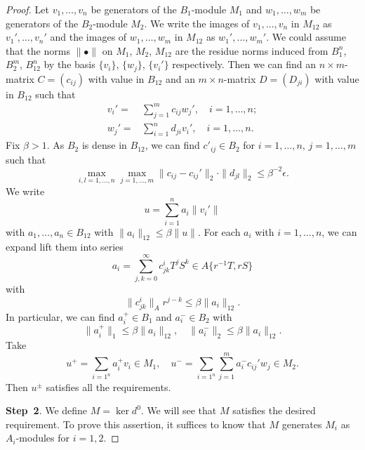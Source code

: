 \begin{proof}
    Let $v_1,\ldots,v_n$ be generators of the $B_1$-module $M_1$ and $w_1,\ldots,w_m$ be generators of the $B_2$-module $M_2$. 
    We write the images of $v_1,\ldots,v_n$ in $M_{12}$ as $v_1',\ldots,v_{n}'$ and the images of $w_1,\ldots,w_m$ in $M_{12}$ as $w_1',\ldots,w_m'$. 
    We could assume that the norms $\|\bullet\|$ on $M_1$, $M_2$, $M_{12}$ are the residue norms induced from $B_1^n$, $B_2^m$, $B_{12}^n$ by the basis $\{v_i\}$, $\{w_j\}$, $\{v_i'\}$ respectively. 
    Then we can find an $n\times m$-matrix $C=(c_{ij})$ with value in $B_{12}$ and an $m\times n$-matrix $D=(D_{ji})$ with value in $B_{12}$ such that
    \[
        \begin{aligned}
            v_i'=&\sum_{j=1}^m c_{ij}w_j',\quad i=1,\ldots,n;   \\
            w_j'=&\sum_{i=1}^n d_{ji}v_i',\quad i=1,\ldots,n.
        \end{aligned}
    \]
    Fix $\beta>1$.
    As $B_2$ is dense in $B_{12}$, we can find $c'_{ij}\in B_2$ 
    for $i=1,\ldots,n$, $j=1,\ldots,m$ such that
    \[
        \max_{i,l=1,\ldots,n} \max_{j=1,\ldots,m} \|c_{ij}-c_{ij}'\|_2\cdot \|d_{jl}\|_2\leq \beta^{-2}\epsilon.
    \]
    We write 
    \[
        u=\sum_{i=1}^n a_i\|v_i'\|  
    \]
    with $a_1,\ldots,a_n\in B_{12}$ with $\|a_i\|_{12}\leq \beta \|u\|$. For each $a_i$ with $i=1,\ldots,n$, we can expand lift them into series
    \[
        a_i=\sum_{j,k=0}^{\infty}c^i_{jk}T^jS^k\in A\{r^{-1}T,rS\}  
    \]
    with 
    \[
        \|c^i_{jk}\|_A r^{j-k}\leq \beta\|a_i\|_{12}.  
    \]
    In particular, we can find $a_i^+\in B_1$ and $a_i^-\in B_2$ with 
    \[
        \|a_i^+\|_1\leq \beta\|a_i\|_{12},\quad   \|a_i^-\|_2\leq \beta\|a_i\|_{12}.
    \]
    Take 
    \[
        u^+=\sum_{i=1^n}a_i^+v_i\in M_1,\quad   u^-=\sum_{i=1^n}\sum_{j=1}^m a_i^-c_{ij}' w_j\in M_2.
    \]
    Then $u^{\pm}$ satisfies all the requirements.

    \textbf{Step~2}. We define $M=\ker d^0$. We will see that $M$ satisfies the desired requirement. 
    To prove this assertion, it suffices to know that $M$ generates $M_i$ as $A_i$-modules for $i=1,2$. 
    

\end{proof}
